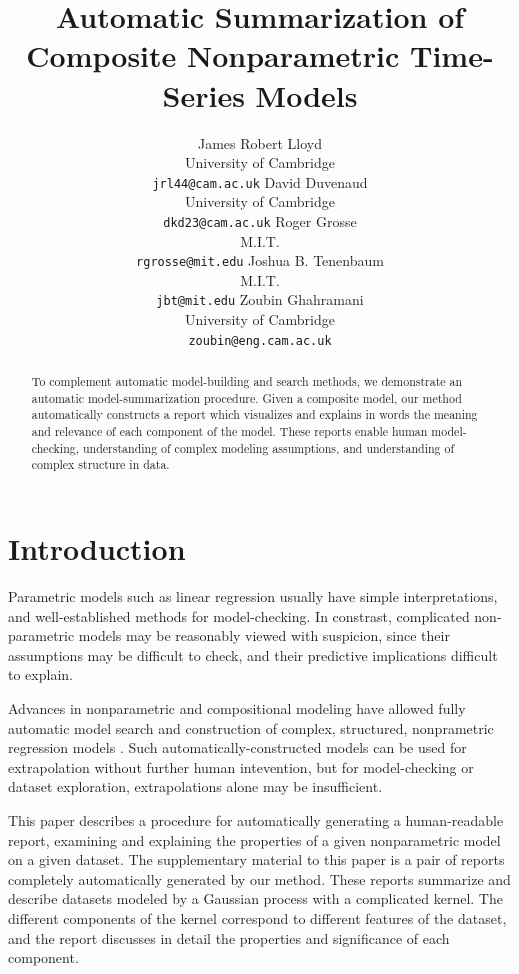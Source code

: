 \documentclass{article} %
\title{Automatic Summarization of Composite Nonparametric Time-Series Models}
\author{
James Robert Lloyd\\
University of Cambridge\\
\texttt{jrl44@cam.ac.uk}
\And
David Duvenaud\\
University of Cambridge \\
\texttt{dkd23@cam.ac.uk}
\And
Roger Grosse\\
M.I.T.\\
\texttt{rgrosse@mit.edu}
\And
Joshua B. Tenenbaum\\
M.I.T.\\
\texttt{jbt@mit.edu}
\And
Zoubin Ghahramani\\
University of Cambridge \\
\texttt{zoubin@eng.cam.ac.uk}
}
\begin{document}
\allowdisplaybreaks

\maketitle

\begin{abstract}
To complement automatic model-building and search methods, we demonstrate an automatic model-summarization procedure.  Given a composite model, our method automatically constructs a report which visualizes and explains in words the meaning and relevance of each component of the model.  These reports enable human model-checking, understanding of complex modeling assumptions, and understanding of complex structure in data.
\end{abstract}

\section{Introduction}



Parametric models such as linear regression usually have simple interpretations, and well-established methods for model-checking.  In constrast, complicated non-parametric models may be reasonably viewed with suspicion, since their assumptions may be difficult to check, and their predictive implications difficult to explain.

Advances in nonparametric and compositional modeling have allowed fully automatic model search and construction of complex, structured, nonprametric regression models \cite{DuvLloGroetal13}.  Such automatically-constructed models can be used for extrapolation without further human intevention, but for model-checking or dataset exploration, extrapolations alone may be insufficient.  

This paper describes a procedure for automatically generating a human-readable report, examining and explaining the properties of a given nonparametric model on a given dataset.  The supplementary material to this paper is a pair of reports completely automatically generated by our method.  These reports summarize and describe datasets modeled by a Gaussian process with a complicated kernel.  The different components of the kernel correspond to different features of the dataset, and the report discusses in detail the properties and significance of each component.
\end{document}
